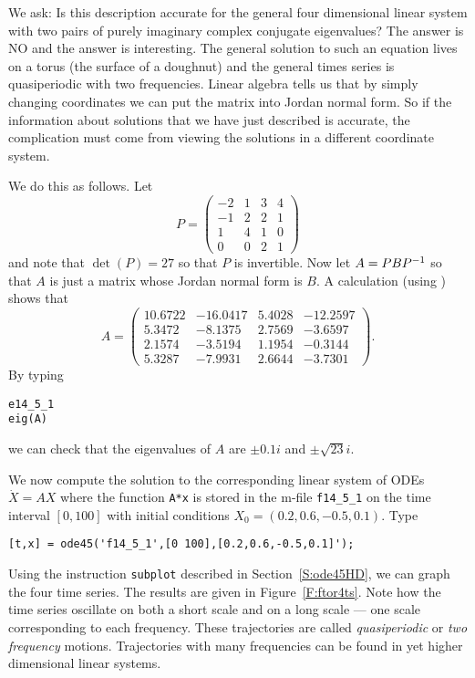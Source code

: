 We ask:  Is this description accurate for the general four dimensional linear 
system with two pairs of purely imaginary complex conjugate eigenvalues?  The 
answer is NO and the answer is interesting.  The general solution
 to such an equation lives on a torus 
(the surface of a doughnut) and the general times series is quasiperiodic
with two frequencies.  Linear algebra 
tells us that by simply changing coordinates we can put the matrix into 
Jordan normal form.  So if the information about 
solutions that we have just described is accurate, the complication must come 
from viewing the solutions in a different coordinate system.

We do this as follows.  Let
\[
P = \left(\begin{array}{rrrr}
   -2  &  1   &  3  &  4 \\
   -1  &  2   &  2  &  1 \\
    1  &  4   &  1  &  0\\
    0  &  0   &  2  &  1
\end{array}\right)
\]
and note that $\det(P)=27$ so that $P$ is invertible.  
Now let
$A=PBP^{-1}$ so that $A$ is just a matrix whose 
Jordan normal form is $B$.
A calculation (using \Matlabp) shows that
\begin{equation*}  \label{e:tor4}
A = \left(\begin{array}{rrrr}
   10.6722 &  -16.0417 &    5.4028 &  -12.2597\\
    5.3472 &   -8.1375 &    2.7569 &   -3.6597\\
    2.1574 &   -3.5194 &    1.1954 &   -0.3144\\
    5.3287 &   -7.9931 &    2.6644 &   -3.7301
\end{array}\right).
\end{equation*}
By typing
\begin{verbatim}
e14_5_1
eig(A)
\end{verbatim}
we can check that the eigenvalues of $A$ are $\pm0.1i$ and $\pm\sqrt{23}i$.

We now compute the solution to the corresponding linear system of ODEs 
$\dot{X}=AX$ where the function {\tt A*x} is stored in the m-file 
{\tt f14\_5\_1} on the time interval $[0,100]$ with 
initial conditions $X_0=(0.2,0.6,-0.5,0.1)$. Type
\begin{verbatim}
[t,x] = ode45('f14_5_1',[0 100],[0.2,0.6,-0.5,0.1]');
\end{verbatim}
Using the \Matlab instruction {\tt subplot} described in 
Section~\ref{S:ode45HD}, we can graph the four time series.
The results are given in 
Figure~\ref{F:ftor4ts}.  Note how the time series oscillate on both a short 
scale and on a long scale --- one scale corresponding to each frequency.  
These trajectories are called {\em quasiperiodic\/}
 or {\em two frequency\/} motions.
  Trajectories with many frequencies can be 
found in yet higher dimensional linear systems.


